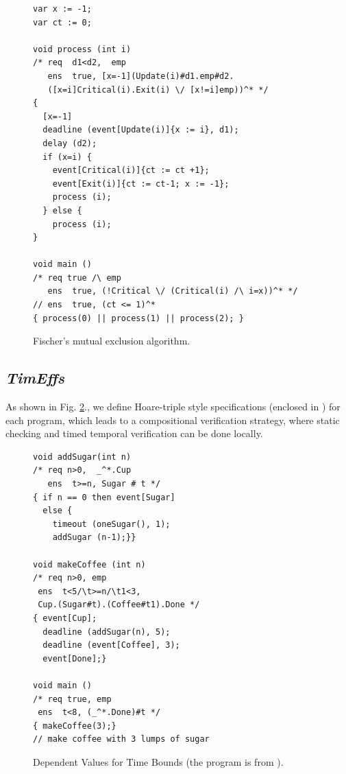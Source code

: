 \documentclass[acmsmall,10pt,review]{acmart}
\newcommand{\timedEffects}{\emph{TimEffs}}
\newcommand{\code}[1]{{\tt{\ensuremath{\m{#1}}}}}
\newcommand{\m}{\mathit}
\newcommand\figref[1]{Fig. \textcolor{black}{\ref{#1}}.}
\begin{document}
\begin{figure}[ht]
  \vspace{0mm}
\begin{lstlisting}[columns=fullflexible]
var x := -1; 
var ct := 0;

void process (int i)
/* req  d1<d2,  emp 
   ens  true, [x=-1](Update(i)#d1.emp#d2.
   ([x=i]Critical(i).Exit(i) \/ [x!=i]emp))^* */
{
  [x=-1] 
  deadline (event[Update(i)]{x := i}, d1);
  delay (d2);
  if (x=i) {
    event[Critical(i)]{ct := ct +1};
    event[Exit(i)]{ct := ct-1; x := -1};
    process (i);
  } else {
    process (i);
}

void main () 
/* req true /\ emp 
   ens  true, (!Critical \/ (Critical(i) /\ i=x))^* */
// ens  true, (ct <= 1)^*
{ process(0) || process(1) || process(2); }
\end{lstlisting}  
  \vspace{0mm}
  \caption{Fischer's mutual exclusion algorithm.}\label{fig:overview_ficher}
     \vspace{0mm}
\end{figure}





\subsection{\timedEffects}
As shown in \figref{fig:overview_eg1}, we define Hoare-triple style specifications (enclosed in \textcolor{darklavender}{}) for each program, which leads to a compositional verification strategy, where static checking and timed temporal verification can be done locally. %

\begin{figure}[ht]
      \vspace{0mm}
\begin{lstlisting}[columns=fullflexible]
void addSugar(int n)
/* req n>0,  _^*.Cup 
   ens  t>=n, Sugar # t */
{ if n == 0 then event[Sugar] 
  else {
    timeout (oneSugar(), 1);
    addSugar (n-1);}}
  
void makeCoffee (int n)
/* req n>0, emp 
 ens  t<5/\t>=n/\t1<3, 
 Cup.(Sugar#t).(Coffee#t1).Done */
{ event[Cup];
  deadline (addSugar(n), 5);
  deadline (event[Coffee], 3);
  event[Done];}
  
void main () 
/* req true, emp 
 ens  t<8, (_^*.Done)#t */
{ makeCoffee(3);}
// make coffee with 3 lumps of sugar

\end{lstlisting}  
      \vspace{0mm}
      \caption{Dependent Values for Time Bounds (the program is from  \cite{berry2020hiphop}).}\label{fig:overview_eg1}
         \vspace{0mm}
\end{figure}
\end{document}
